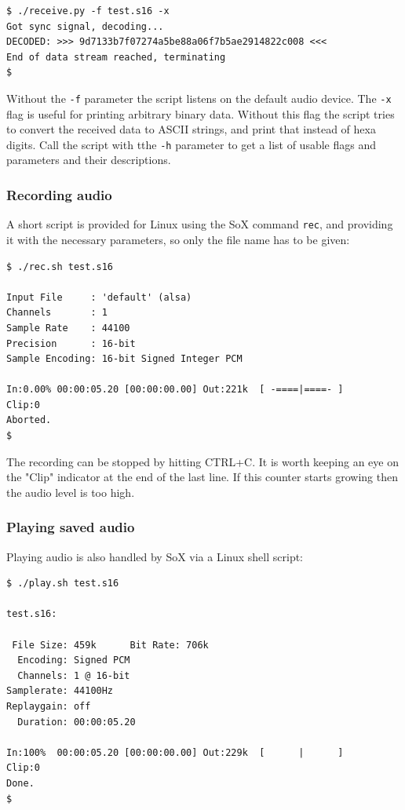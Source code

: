 \documentclass[a4paper]{article}
\begin{document}
\begin{lstlisting}
$ ./receive.py -f test.s16 -x
Got sync signal, decoding... 
DECODED: >>> 9d7133b7f07274a5be88a06f7b5ae2914822c008 <<<
End of data stream reached, terminating
$
\end{lstlisting}

Without the \texttt{-f} parameter the script listens on the default 
audio device. The \texttt{-x} flag is useful for printing arbitrary 
binary data. Without this flag the script tries to convert the received 
data to ASCII strings, and print that instead of hexa digits. Call the 
script with tthe \texttt{-h} parameter to get a list of usable flags 
and parameters and their descriptions.

\subsubsection{Recording audio}

A short script is provided for Linux using the SoX command 
\texttt{rec}, and providing it with the necessary parameters, so only 
the file name has to be given:

\begin{lstlisting}
$ ./rec.sh test.s16

Input File     : 'default' (alsa)
Channels       : 1
Sample Rate    : 44100
Precision      : 16-bit
Sample Encoding: 16-bit Signed Integer PCM

In:0.00% 00:00:05.20 [00:00:00.00] Out:221k  [ -====|====- ]      Clip:0
Aborted.
$
\end{lstlisting}

The recording can be stopped by hitting CTRL+C. It is worth keeping an 
eye on the "Clip" indicator at the end of the last line. If this 
counter starts growing then the audio level is too high.

\subsubsection{Playing saved audio}

Playing audio is also handled by SoX via a Linux shell script:

\begin{lstlisting}
$ ./play.sh test.s16 

test.s16:

 File Size: 459k      Bit Rate: 706k
  Encoding: Signed PCM    
  Channels: 1 @ 16-bit   
Samplerate: 44100Hz      
Replaygain: off         
  Duration: 00:00:05.20  

In:100%  00:00:05.20 [00:00:00.00] Out:229k  [      |      ]      Clip:0    
Done.
$
\end{lstlisting}
\end{document}
